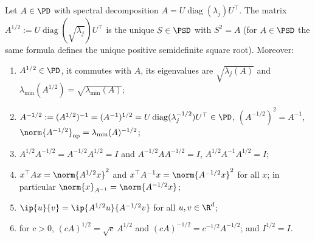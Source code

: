 \begin{lemma}\label{lem:sqrt_props}
Let $A \in \PD$ with spectral decomposition $A = U\operatorname{diag}(\lambda_j)U^\top$. The
matrix $A^{1/2} := U\operatorname{diag}(\sqrt{\lambda_j})U^\top$ is the unique $S \in \PSD$ with
$S^2 = A$ (for $A \in \PSD$ the same formula defines the unique positive semidefinite square
root). Moreover:
\begin{enumerate}
  \item[(i)] $A^{1/2} \in \PD$, it commutes with $A$, its eigenvalues are $\sqrt{\lambda_j(A)}$
        and $\lambda_{\min}(A^{1/2}) = \sqrt{\lambda_{\min}(A)}$;
  \item[(ii)] $A^{-1/2} := (A^{1/2})^{-1} = (A^{-1})^{1/2} = U\operatorname{diag}(\lambda_j^{-1/2})U^\top
        \in \PD$, $(A^{-1/2})^2 = A^{-1}$, $\norm{A^{-1/2}}_{\mathrm{op}} = \lambda_{\min}(A)^{-1/2}$;
  \item[(iii)] $A^{1/2} A^{-1/2} = A^{-1/2} A^{1/2} = I$ and $A^{-1/2} A A^{-1/2} = I$,
        $A^{1/2} A^{-1} A^{1/2} = I$;
  \item[(iv)] $x^\top A x = \norm{A^{1/2}x}^2$ and $x^\top A^{-1} x = \norm{A^{-1/2}x}^2$ for all
        $x$; in particular $\norm{x}_{A^{-1}} = \norm{A^{-1/2}x}$;
  \item[(v)] $\ip{u}{v} = \ip{A^{1/2}u}{A^{-1/2}v}$ for all $u, v \in \R^d$;
  \item[(vi)] for $c > 0$, $(cA)^{1/2} = \sqrt c\, A^{1/2}$ and $(cA)^{-1/2} = c^{-1/2}A^{-1/2}$;
        and $I^{1/2} = I$.
\end{enumerate}
\end{lemma}

